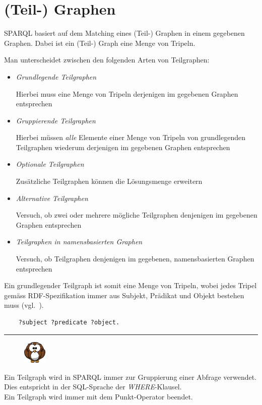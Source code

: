 \section{(Teil-) Graphen}
\label{sec:sparql_graph}

SPARQL basiert auf dem Matching eines (Teil-) Graphen in einem gegebenen Graphen. Dabei ist ein (Teil-) Graph eine Menge von Tripeln.

Man unterscheidet zwischen den folgenden Arten von Teilgraphen:
\begin{itemize}
\item \textit{Grundlegende Teilgraphen}

Hierbei muss eine Menge von Tripeln derjenigen im gegebenen Graphen entsprechen

\item \textit{Gruppierende Teilgraphen}

Hierbei müssen \textit{alle} Elemente einer Menge von Tripeln von grundlegenden Teilgraphen wiederum derjenigen im gegebenen Graphen entsprechen

\item \textit{Optionale Teilgraphen}

Zusätzliche Teilgraphen können die Lösungsmenge erweitern

\item \textit{Alternative Teilgraphen}

Versuch, ob zwei oder mehrere mögliche Teilgraphen denjenigen im gegebenen Graphen entsprechen

\item \textit{Teilgraphen in namensbasierten Graphen}

Versuch, ob Teilgraphen denjenigen im gegebenen, namensbasierten Graphen entsprechen
\end{itemize}

Ein grundlegender Teilgraph ist somit eine Menge von Tripeln, wobei jedes Tripel gemäss RDF-Spezifikation immer aus Subjekt, Prädikat und Objekt bestehen muss (vgl.~\cite[3.1 Triples]{w3rdf}).

\begin{lstlisting}
    ?subject ?predicate ?object.
\end{lstlisting}

\noindent\rule[1ex]{\textwidth}{1pt}
\begin{figure}
    \vspace{-16pt}
    \includegraphics[width=0.1\textwidth]{bilder/owl.png}
\end{figure}
Ein Teilgraph wird in SPARQL immer zur Gruppierung einer Abfrage verwendet. Dies entspricht in der SQL-Sprache der \textit{WHERE}-Klausel.\\
Ein Teilgraph wird immer mit dem Punkt-Operator beendet.

